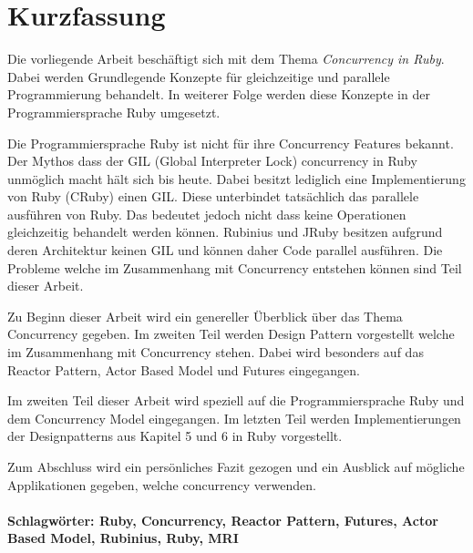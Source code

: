 \section*{Kurzfassung}
\vspace{0.5cm}

Die vorliegende Arbeit beschäftigt sich mit dem Thema \emph{Concurrency in Ruby}. Dabei werden Grundlegende Konzepte für gleichzeitige und parallele Programmierung behandelt. In weiterer Folge werden diese Konzepte in der Programmiersprache Ruby umgesetzt. 

Die Programmiersprache Ruby ist nicht für ihre Concurrency Features bekannt. Der Mythos dass der GIL (Global Interpreter Lock) concurrency in Ruby unmöglich macht hält sich bis heute. Dabei besitzt lediglich eine Implementierung von Ruby (CRuby) einen GIL. Diese unterbindet tatsächlich das parallele ausführen von Ruby. Das bedeutet jedoch nicht dass keine Operationen gleichzeitig behandelt werden können. Rubinius und JRuby besitzen aufgrund deren Architektur keinen GIL und können daher Code parallel ausführen. Die Probleme welche im Zusammenhang mit Concurrency entstehen können sind Teil dieser Arbeit. 

Zu Beginn dieser Arbeit wird ein genereller Überblick über das Thema Concurrency gegeben. Im zweiten Teil werden Design Pattern vorgestellt welche im Zusammenhang mit Concurrency stehen. Dabei wird besonders auf das Reactor Pattern, Actor Based Model und Futures eingegangen.

Im zweiten Teil dieser Arbeit wird speziell auf die Programmiersprache Ruby und dem Concurrency Model eingegangen. Im letzten Teil werden Implementierungen der Designpatterns aus Kapitel 5 und 6 in Ruby vorgestellt.

Zum Abschluss wird ein persönliches Fazit gezogen und ein Ausblick auf mögliche Applikationen gegeben, welche concurrency verwenden. 


\paragraph{Schlagwörter: Ruby, Concurrency, Reactor Pattern, Futures, Actor Based Model, Rubinius, Ruby, MRI}